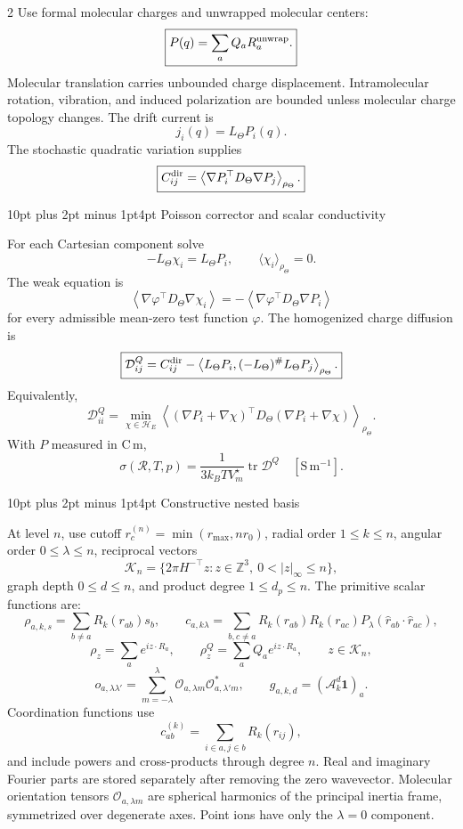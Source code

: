\documentclass[10pt]{article}
\makeatletter
\renewcommand\section{\@startsection{section}{1}{0pt}%
  {10pt plus 2pt minus 1pt}{4pt}%
  {\large\sffamily\bfseries\color{lithioxfontgreen}}}
\newcommand{\tr}{\operatorname{tr}}
\newcommand{\pinv}{^{\#}}
\makeatother
\begin{document}
\begin{multicols}{2}
Use formal molecular charges and unwrapped molecular centers:
\[
\boxed{P(q)=\sum_aQ_aR_a^{\rm unwrap}.}
\]
Molecular translation carries unbounded charge displacement. Intramolecular rotation,
vibration, and induced polarization are bounded unless molecular charge topology
changes. The drift current is
\[
j_i(q)=L_\Theta P_i(q).
\]
The stochastic quadratic variation supplies
\[
\boxed{
C^{\rm dir}_{ij}=
\left\langle\nabla P_i^\top D_\Theta\nabla P_j
\right\rangle_{\rho_\Theta}.}
\]

\section{Poisson corrector and scalar conductivity}

For each Cartesian component solve
\[
\boxed{
-L_\Theta\chi_i=L_\Theta P_i,\qquad
\langle\chi_i\rangle_{\rho_\Theta}=0.}
\]
The weak equation is
\[
\left\langle\nabla\varphi^\top D_\Theta\nabla\chi_i\right\rangle
=-\left\langle\nabla\varphi^\top D_\Theta\nabla P_i\right\rangle
\]
for every admissible mean-zero test function \(\varphi\). The homogenized charge
diffusion is
\[
\boxed{
\mathcal D^Q_{ij}=C^{\rm dir}_{ij}
-\left\langle L_\Theta P_i,
(-L_\Theta)\pinv L_\Theta P_j\right\rangle_{\rho_\Theta}.}
\]
Equivalently,
\[
\mathcal D^Q_{ii}=
\min_{\chi\in\mathcal H_E}
\left\langle(\nabla P_i+\nabla\chi)^\top
D_\Theta(\nabla P_i+\nabla\chi)\right\rangle_{\rho_\Theta}.
\]
With \(P\) measured in \(\mathrm{C\,m}\),
\[
\boxed{
\sigma(\mathcal R,T,p)=
\frac{1}{3k_BTV_m^\star}\tr\mathcal D^Q
\quad[\mathrm{S\,m^{-1}}].}
\]

\section{Constructive nested basis}

At level \(n\), use cutoff \(r_c^{(n)}=\min(r_{\max},nr_0)\), radial order
\(1\le k\le n\), angular order \(0\le\lambda\le n\), reciprocal vectors
\[
\mathcal K_n=\{2\pi H^{-\top}z:z\in\mathbb Z^3,\ 0<|z|_\infty\le n\},
\]
graph depth \(0\le d\le n\), and product degree \(1\le d_p\le n\).  The primitive
scalar functions are:
\[
\rho_{a,k,s}=\sum_{b\ne a}R_k(r_{ab})s_b,\qquad
c_{a,k\lambda}=\sum_{b,c\ne a}
R_k(r_{ab})R_k(r_{ac})
P_\lambda(\widehat r_{ab}\cdot\widehat r_{ac}),
\]
\[
\rho_z=\sum_a e^{iz\cdot R_a},\qquad
\rho_z^Q=\sum_aQ_ae^{iz\cdot R_a},\qquad z\in\mathcal K_n,
\]
\[
o_{a,\lambda\lambda'}=
\sum_{m=-\lambda}^{\lambda}
\mathcal O_{a,\lambda m}\mathcal O_{a,\lambda' m}^\ast,\qquad
g_{a,k,d}=(\mathcal A_k^d\mathbf1)_a .
\]
Coordination functions use
\[
c_{ab}^{(k)}=\sum_{i\in a,j\in b}
R_k(r_{ij}),
\]
and include powers and cross-products through degree \(n\).  Real and imaginary
Fourier parts are stored separately after removing the zero wavevector.
Molecular orientation tensors \(\mathcal O_{a,\lambda m}\) are spherical harmonics
of the principal inertia frame, symmetrized over degenerate axes.  Point ions have
only the \(\lambda=0\) component.


\end{multicols}
\end{document}
